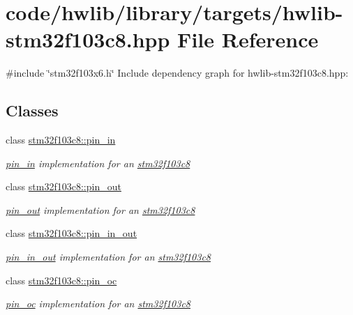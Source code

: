 \hypertarget{hwlib-stm32f103c8_8hpp}{}\section{code/hwlib/library/targets/hwlib-\/stm32f103c8.hpp File Reference}
\label{hwlib-stm32f103c8_8hpp}
{\ttfamily \#include \char`\"{}stm32f103x6.\+h\char`\"{}}\newline
Include dependency graph for hwlib-\/stm32f103c8.hpp\+:
\subsection*{Classes}
\begin{DoxyCompactItemize}
\item 
class \hyperlink{classstm32f103c8_1_1pin__in}{stm32f103c8\+::pin\+\_\+in}
\begin{DoxyCompactList}\small\item\em \hyperlink{classstm32f103c8_1_1pin__in}{pin\+\_\+in} implementation for an \hyperlink{namespacestm32f103c8}{stm32f103c8} \end{DoxyCompactList}\item 
class \hyperlink{classstm32f103c8_1_1pin__out}{stm32f103c8\+::pin\+\_\+out}
\begin{DoxyCompactList}\small\item\em \hyperlink{classstm32f103c8_1_1pin__out}{pin\+\_\+out} implementation for an \hyperlink{namespacestm32f103c8}{stm32f103c8} \end{DoxyCompactList}\item 
class \hyperlink{classstm32f103c8_1_1pin__in__out}{stm32f103c8\+::pin\+\_\+in\+\_\+out}
\begin{DoxyCompactList}\small\item\em \hyperlink{classstm32f103c8_1_1pin__in__out}{pin\+\_\+in\+\_\+out} implementation for an \hyperlink{namespacestm32f103c8}{stm32f103c8} \end{DoxyCompactList}\item 
class \hyperlink{classstm32f103c8_1_1pin__oc}{stm32f103c8\+::pin\+\_\+oc}
\begin{DoxyCompactList}\small\item\em \hyperlink{classstm32f103c8_1_1pin__oc}{pin\+\_\+oc} implementation for an \hyperlink{namespacestm32f103c8}{stm32f103c8} \end{DoxyCompactList}\end{DoxyCompactItemize}
